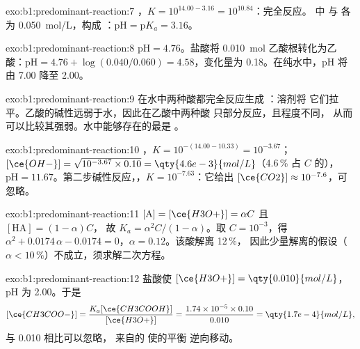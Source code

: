 \begin{solution}{exo:b1:predominant-reaction:7}
，$K = 10^{14.00 - 3.16} = 10^{10.84}$：完全反应。
中  与  各为 \qty{0.050}{mol/L}，构成
：$\mathrm{pH} = \mathrm{p}K_a = 3.16$。
\end{solution}

\begin{solution}{exo:b1:predominant-reaction:8}
$\mathrm{pH} = 4.76$。盐酸将 \qty{0.010}{mol}
乙酸根转化为乙酸：$\mathrm{pH} = 4.76 + \log(0.040/0.060) = 4.58$，变化量为
0.18。在纯水中，pH 将由 7.00 降至 2.00。
\end{solution}

\begin{solution}{exo:b1:predominant-reaction:9}
在水中两种酸都完全反应生成 ：溶剂将
它们拉平。乙酸的碱性远弱于水，因此在乙酸中两种酸
只部分反应，且程度不同，
从而可以比较其强弱。水中能够存在的最是 。
\end{solution}

\begin{solution}{exo:b1:predominant-reaction:10}
，$K = 10^{-(14.00 - 10.33)} = 10^{-3.67}$；
$[\ce{OH-}] = \sqrt{10^{-3.67} \times 0.10} = \qty{4.6e-3}{mol/L}$（4.6\,\%
占 $C$ 的），$\mathrm{pH} = 11.67$。第二步碱性反应，，$K = 10^{-7.63}$：它给出 $[\ce{CO2}] \approx
10^{-7.6}$，可忽略。
\end{solution}

\begin{solution}{exo:b1:predominant-reaction:11}
$[\mathrm{A}] = [\ce{H3O+}] = \alpha C$ 且 $[\mathrm{HA}] = (1 - \alpha)C$，
故 $K_a = \alpha^2C/(1 - \alpha)$。取 $C = 10^{-3}$，得 $\alpha^2 +
0.0174\,\alpha - 0.0174 = 0$，$\alpha = 0.12$。该酸解离 12\,\%，
因此少量解离的假设（$\alpha <
10\,\%$）不成立，须求解二次方程。
\end{solution}

\begin{solution}{exo:b1:predominant-reaction:12}
盐酸使 $[\ce{H3O+}] = \qty{0.010}{mol/L}$，pH 为 2.00。于是
\[
  [\ce{CH3COO-}] = \frac{K_a[\ce{CH3COOH}]}{[\ce{H3O+}]} = \frac{1.74 \times 10^{-5}
  \times 0.10}{0.010} = \qty{1.7e-4}{mol/L},
\]
与 0.010 相比可以忽略，
来自的  使的平衡
逆向移动。
\end{solution}

